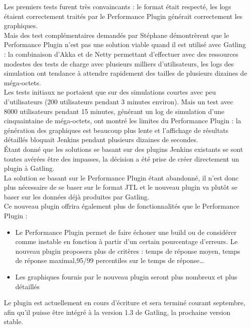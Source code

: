Les premiers tests furent très convaincants : le format était respecté, les logs étaient correctement traités par le Performance Plugin générait correctement les graphiques.\\
Mais des test complémentaires demandés par Stéphane démontrèrent que le Performance Plugin n'est pas une solution viable quand il est utilisé avec Gatling :  la combinaison d'Akka et de Netty permettant d'effectuer avec des ressources modestes des tests de charge avec plusieurs milliers d'utilisateurs, les logs des simulation ont tendance à attendre rapidement des tailles de plusieurs dizaines de méga-octets.\\
Les tests initiaux ne portaient que sur des simulations courtes avec peu d'utilisateurs (200 utilisateurs pendant 3 minutes environ). Mais un test avec 8000 utilisateurs pendant 15 minutes, générant un log de simulation d'une cinquaintaine de méga-octets, ont montré les limites du Performance Plugin : la génération des graphiques est beaucoup plus lente et l'affichage de résultats détaillés bloquait Jenkins pendant plusieurs dizaines de secondes.\\[1cm]

Étant donné que les solutions se basant sur des plugins Jenkins existants se sont toutes avérées être des impasses, la décision a été prise de créer directement un plugin  à Gatling.\\
La solution se basant sur le Performance Plugin étant abandonné, il n'est donc plus nécessaire de se baser sur le format JTL et le nouveau plugin va plutôt se baser sur les données déjà produites par Gatling.\\

Ce nouveau plugin offrira également plus de fonctionnalités que le Performance Plugin :
\begin{itemize}
	\item Le Performance Plugin permet de faire échouer une build ou de considérer comme instable en fonction à partir d'un certain pourcentage d'erreurs. Le nouveau plugin proposera plus de critères : temps de réponse moyen, temps de réponse maximal,95/99 percentiles sur le temps de réponse\ldots
	\item Les graphiques fournis par le nouveau plugin seront plus nombreux et plus détaillés\\
\end{itemize}

Le plugin est actuellement en cours d'écriture et sera terminé courant septembre, afin qu'il puisse \^etre intégré à la version 1.3 de Gatling, la prochaine version stable. 
